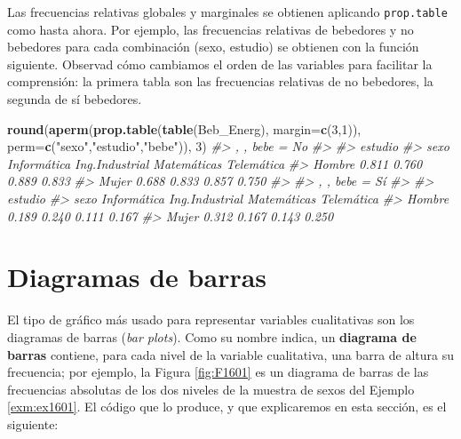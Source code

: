 \documentclass[
]{book}
\newenvironment{Shaded}{\begin{snugshade}}{\end{snugshade}}
\newcommand{\CommentTok}[1]{\textcolor[rgb]{0.56,0.35,0.01}{\textit{#1}}}
\newcommand{\DataTypeTok}[1]{\textcolor[rgb]{0.13,0.29,0.53}{#1}}
\newcommand{\DecValTok}[1]{\textcolor[rgb]{0.00,0.00,0.81}{#1}}
\newcommand{\KeywordTok}[1]{\textcolor[rgb]{0.13,0.29,0.53}{\textbf{#1}}}
\newcommand{\NormalTok}[1]{#1}
\newcommand{\StringTok}[1]{\textcolor[rgb]{0.31,0.60,0.02}{#1}}
\theoremstyle{definition}
\theoremstyle{definition}
\theoremstyle{definition}
\theoremstyle{remark}
\begin{document}
Las frecuencias relativas globales y marginales se obtienen aplicando \texttt{prop.table} como hasta ahora. Por ejemplo, las frecuencias relativas de bebedores y no bebedores para cada combinación (sexo, estudio) se obtienen con la función siguiente. Observad cómo cambiamos el orden de las variables para facilitar la comprensión: la primera tabla son las frecuencias relativas de no bebedores, la segunda de sí bebedores.

\begin{Shaded}
\begin{Highlighting}[]
\KeywordTok{round}\NormalTok{(}\KeywordTok{aperm}\NormalTok{(}\KeywordTok{prop.table}\NormalTok{(}\KeywordTok{table}\NormalTok{(Beb\_Energ), }\DataTypeTok{margin=}\KeywordTok{c}\NormalTok{(}\DecValTok{3}\NormalTok{,}\DecValTok{1}\NormalTok{)), }\DataTypeTok{perm=}\KeywordTok{c}\NormalTok{(}\StringTok{"sexo"}\NormalTok{,}\StringTok{"estudio"}\NormalTok{,}\StringTok{"bebe"}\NormalTok{)), }\DecValTok{3}\NormalTok{)}
\CommentTok{\#\textgreater{} , , bebe = No}
\CommentTok{\#\textgreater{} }
\CommentTok{\#\textgreater{}         estudio}
\CommentTok{\#\textgreater{} sexo     Informática Ing.Industrial Matemáticas Telemática}
\CommentTok{\#\textgreater{}   Hombre       0.811          0.760       0.889      0.833}
\CommentTok{\#\textgreater{}   Mujer        0.688          0.833       0.857      0.750}
\CommentTok{\#\textgreater{} }
\CommentTok{\#\textgreater{} , , bebe = Sí}
\CommentTok{\#\textgreater{} }
\CommentTok{\#\textgreater{}         estudio}
\CommentTok{\#\textgreater{} sexo     Informática Ing.Industrial Matemáticas Telemática}
\CommentTok{\#\textgreater{}   Hombre       0.189          0.240       0.111      0.167}
\CommentTok{\#\textgreater{}   Mujer        0.312          0.167       0.143      0.250}
\end{Highlighting}
\end{Shaded}

\hypertarget{diagramas-de-barras}{%
\section{Diagramas de barras}\label{diagramas-de-barras}}

El tipo de gráfico más usado para representar variables cualitativas son los diagramas de barras (\emph{bar plots}). Como su nombre indica, un \textbf{diagrama de barras} contiene, para cada nivel de la variable cualitativa, una barra de altura su frecuencia; por ejemplo, la Figura \ref{fig:F1601} es un diagrama de barras de las frecuencias absolutas de los dos niveles de la muestra de sexos del Ejemplo \ref{exm:ex1601}. El código que lo produce, y que explicaremos en esta sección, es el siguiente:
\end{document}
